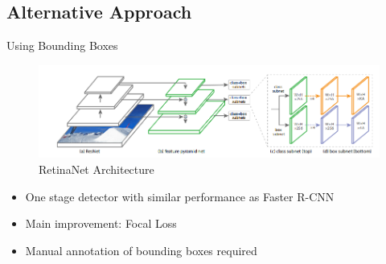 \documentclass[10pt]{beamer}
\begin{document}
\subsection{Alternative Approach}
\begin{frame}{Using Bounding Boxes}
	\begin{figure}
		\includegraphics[width=\columnwidth]{images/retinanet.png}
		\caption{RetinaNet Architecture}
	\end{figure}

	\begin{itemize}
		\item One stage detector with similar performance as Faster R-CNN
		\item Main improvement: Focal Loss
		\item Manual annotation of bounding boxes required
	\end{itemize}
\end{frame}

\end{document}
